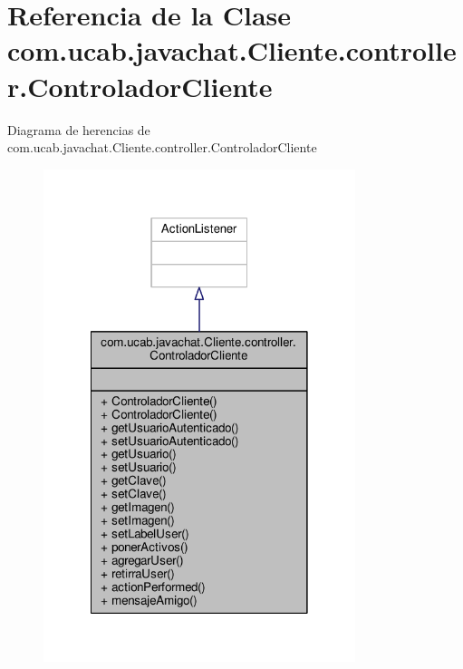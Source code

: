 \hypertarget{classcom_1_1ucab_1_1javachat_1_1_cliente_1_1controller_1_1_controlador_cliente}{\section{Referencia de la Clase com.\-ucab.\-javachat.\-Cliente.\-controller.\-Controlador\-Cliente}
\label{classcom_1_1ucab_1_1javachat_1_1_cliente_1_1controller_1_1_controlador_cliente}
}


Diagrama de herencias de com.\-ucab.\-javachat.\-Cliente.\-controller.\-Controlador\-Cliente
\nopagebreak
\begin{figure}[H]
\begin{center}
\leavevmode
\includegraphics[width=258pt]{dd/d62/classcom_1_1ucab_1_1javachat_1_1_cliente_1_1controller_1_1_controlador_cliente__inherit__graph}
\end{center}
\end{figure}


